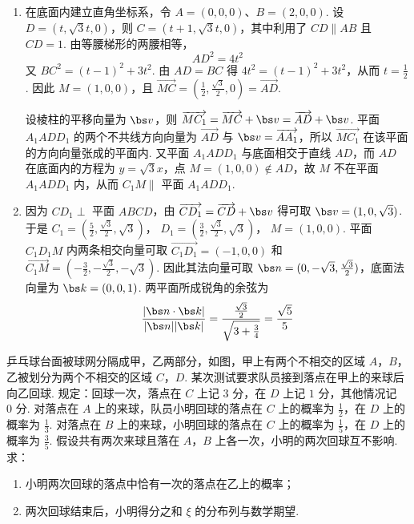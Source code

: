 \begin{solution}
\begin{enumerate}
\item 在底面内建立直角坐标系，令
\(A=(0,0,0)\)、\(B=(2,0,0)\). 设 \(D=(t,\sqrt3t,0)\)，则
\(C=(t+1,\sqrt3t,0)\)，其中利用了 \(CD\parallel AB\) 且 \(CD=1\). 由等腰梯形的两腰相等，
\[
AD^2=4t^2
\]
又 \(BC^2=(t-1)^2+3t^2\). 由 \(AD=BC\) 得
\(4t^2=(t-1)^2+3t^2\)，从而 \(t=\frac12\). 因此 \(M=(1,0,0)\)，且
\(\overrightarrow{MC}=\left(\frac12,\frac{\sqrt3}{2},0\right)=\overrightarrow{AD}\).

设棱柱的平移向量为 \(\bs v\)，则 \(\overrightarrow{MC_1}=\overrightarrow{MC}+\bs v=\overrightarrow{AD}+\bs v\). 平面 \(A_1ADD_1\) 的两个不共线方向向量为 \(\overrightarrow{AD}\) 与 \(\bs v=\overrightarrow{AA_1}\)，所以 \(\overrightarrow{MC_1}\) 在该平面的方向向量张成的平面内. 又平面 \(A_1ADD_1\) 与底面相交于直线 \(AD\)，而 \(AD\) 在底面内的方程为 \(y=\sqrt3x\)，点 \(M=(1,0,0)\notin AD\)，故 \(M\) 不在平面 \(A_1ADD_1\) 内，从而 \(C_1M\parallel\) 平面 \(A_1ADD_1\).

\item 因为 \(CD_1\perp\) 平面 \(ABCD\)，由
\(\overrightarrow{CD_1}=\overrightarrow{CD}+\bs v\) 得可取 \(\bs v=(1,0,\sqrt3)\). 于是
\(C_1=\left(\frac52,\frac{\sqrt3}{2},\sqrt3\right)\)，
\(D_1=\left(\frac32,\frac{\sqrt3}{2},\sqrt3\right)\)，
\(M=(1,0,0)\). 平面 \(C_1D_1M\) 内两条相交向量可取
\(\overrightarrow{C_1D_1}=(-1,0,0)\) 和
\(\overrightarrow{C_1M}=\left(-\frac32,-\frac{\sqrt3}{2},-\sqrt3\right)\).
因此其法向量可取
\(\bs n=(0,-\sqrt3,\frac{\sqrt3}{2})\)，底面法向量为 \(\bs k=(0,0,1)\). 两平面所成锐角的余弦为
\[
\frac{|\bs n\cdot\bs k|}{|\bs n||\bs k|}
=\frac{\frac{\sqrt3}{2}}{\sqrt{3+\frac34}}
=\frac{\sqrt5}{5}
\]
\end{enumerate}
\end{solution}

\begin{problem}
乒乓球台面被球网分隔成甲，乙两部分，如图，甲上有两个不相交的区域 \(A\)，\(B\)，乙被划分为两个不相交的区域 \(C\)，\(D\). 某次测试要求队员接到落点在甲上的来球后向乙回球. 规定：回球一次，落点在 \(C\) 上记 \(3\text{ 分}\)，在 \(D\) 上记 \(1\text{ 分}\)，其他情况记 \(0\text{ 分}\). 对落点在 \(A\) 上的来球，队员小明回球的落点在 \(C\) 上的概率为 \(\frac{1}{2}\)，在 \(D\) 上的概率为 \(\frac{1}{3}\). 对落点在 \(B\) 上的来球，小明回球的落点在 \(C\) 上的概率为 \(\frac{1}{5}\)，在 \(D\) 上的概率为 \(\frac{3}{5}\). 假设共有两次来球且落在 \(A\)，\(B\) 上各一次，小明的两次回球互不影响. 求：

\begin{enumerate}
\item 小明两次回球的落点中恰有一次的落点在乙上的概率；
\item 两次回球结束后，小明得分之和 \(\xi\) 的分布列与数学期望.
\end{enumerate}

\end{problem}

